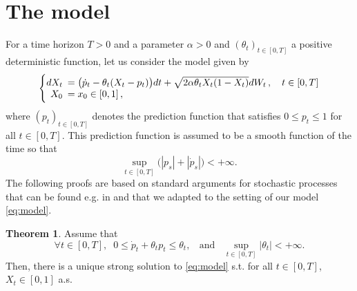 \documentclass[11pt]{article}
\theoremstyle{definition}
\newtheorem{Thm}[Def]{Theorem}
\begin{document}
\section{The model}
For a time horizon $T>0$ and  a parameter $\alpha > 0$ and $(\theta_t)_{t\in[0,T]}$ a positive deterministic  function,  let us consider the model  given by
\begin{equation}
  \left\{
  \begin{array}{@{}rl@{}}
    dX_t \!\!\!&= \big(\dot p_t - \theta_t (X_t-p_t)  \big)dt  +\sqrt{2 \alpha \theta_t X_t (1-X_t)} dW_t\,, \quad t\in[0,T] \\
   X_0  \!\!\!&=  x_0\in [0,1] \,,
 \end{array}\right.  \label{eq:model}
\end{equation}
where $(p_t)_{t\in[0,T]}$ denotes the prediction function that satisfies $0\le p_t\le 1$ for all $t\in[0,T]$. This prediction function is assumed to be a smooth function of the time so that 
$$\sup_{t\in[0,T]}\bigl( |p_s| + |\dot p_s|\big) <+\infty .$$
The following proofs are based on standard arguments for stochastic processes that can be found e.g. in \cite{Alf} and \cite{KarShr} that we adapted to the setting of our model \eqref{eq:model}.
\begin{Thm}\label{thm:exun}
Assume that    
\begin{equation}\label{Assumption:1}
\forall  t\in[0,T],\;\; 0\le \dot p_t +\theta_tp_t\le \theta_t, \;\;\mbox{ and }\;\;
\sup_{t\in[0,T]}|\theta_t|<+\infty\tag{A}. 
\end{equation}
Then, there is a unique strong solution to \eqref{eq:model} s.t.  for all $t\in[0,T]$, $X_t\in[0,1]$ a.s.
\end{Thm}
\end{document}
